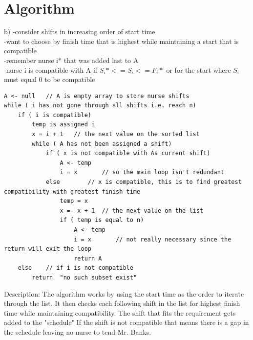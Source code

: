 \documentclass[11pt]{article}
\begin{document}
\section*{Algorithm} 
b)
-consider shifts in increasing order of start time  \\
-want to choose by finish time that is highest while maintaining a start that is compatible\\
-remember nurse i* that was added last to A \\
-nurse i is compatible with A if $S_i* <= S_i <= F_i*$ or for the start where $S_i$ must equal 0 to be compatible \\
\begin{lstlisting}
A <- null 	// A is empty array to store nurse shifts
while ( i has not gone through all shifts i.e. reach n)
	if ( i is compatible)
		temp is assigned i
		x = i + 1	// the next value on the sorted list
		while ( A has not been assigned a shift)
			if ( x is not compatible with As current shift)
				A <- temp
				i = x 		// so the main loop isn't redundant 
			else 		// x is compatible, this is to find greatest compatibility with greatest finish time
				temp = x 
				x =- x + 1 	// the next value on the list
				if ( temp is equal to n)
					A <- temp
					i = x 		// not really necessary since the return will exit the loop
					return A
	else 	// if i is not compatible 
		return  "no such subset exist"
\end{lstlisting}

\begin{text} 
Description:
The algorithm works by using the start time as the order to iterate through the list. It then checks each following shift in the list for highest finish time while maintaining compatibility. The shift that fits the requirement gets added to the "schedule" If the shift is not compatible that means there is a gap in the schedule leaving no nurse to tend Mr. Banks. 
\end{text}
\end{document}
